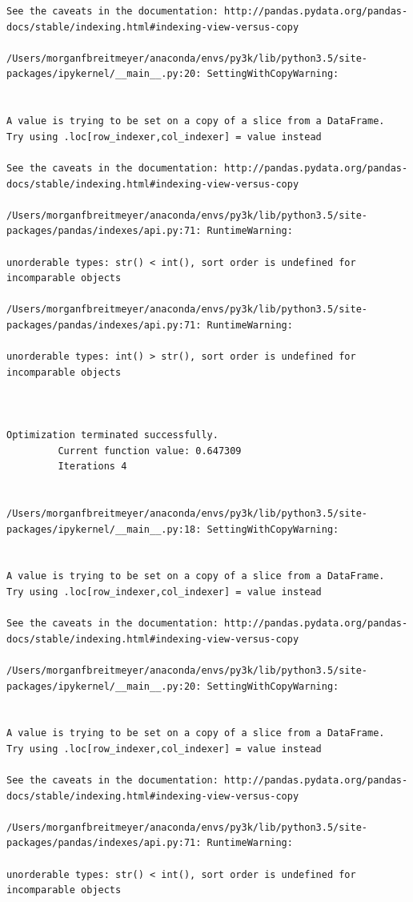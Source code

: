 \begin{lstlisting}
See the caveats in the documentation: http://pandas.pydata.org/pandas-docs/stable/indexing.html#indexing-view-versus-copy

/Users/morganfbreitmeyer/anaconda/envs/py3k/lib/python3.5/site-packages/ipykernel/__main__.py:20: SettingWithCopyWarning:


A value is trying to be set on a copy of a slice from a DataFrame.
Try using .loc[row_indexer,col_indexer] = value instead

See the caveats in the documentation: http://pandas.pydata.org/pandas-docs/stable/indexing.html#indexing-view-versus-copy

/Users/morganfbreitmeyer/anaconda/envs/py3k/lib/python3.5/site-packages/pandas/indexes/api.py:71: RuntimeWarning:

unorderable types: str() < int(), sort order is undefined for incomparable objects

/Users/morganfbreitmeyer/anaconda/envs/py3k/lib/python3.5/site-packages/pandas/indexes/api.py:71: RuntimeWarning:

unorderable types: int() > str(), sort order is undefined for incomparable objects



Optimization terminated successfully.
         Current function value: 0.647309
         Iterations 4


/Users/morganfbreitmeyer/anaconda/envs/py3k/lib/python3.5/site-packages/ipykernel/__main__.py:18: SettingWithCopyWarning:


A value is trying to be set on a copy of a slice from a DataFrame.
Try using .loc[row_indexer,col_indexer] = value instead

See the caveats in the documentation: http://pandas.pydata.org/pandas-docs/stable/indexing.html#indexing-view-versus-copy

/Users/morganfbreitmeyer/anaconda/envs/py3k/lib/python3.5/site-packages/ipykernel/__main__.py:20: SettingWithCopyWarning:


A value is trying to be set on a copy of a slice from a DataFrame.
Try using .loc[row_indexer,col_indexer] = value instead

See the caveats in the documentation: http://pandas.pydata.org/pandas-docs/stable/indexing.html#indexing-view-versus-copy

/Users/morganfbreitmeyer/anaconda/envs/py3k/lib/python3.5/site-packages/pandas/indexes/api.py:71: RuntimeWarning:

unorderable types: str() < int(), sort order is undefined for incomparable objects


\end{lstlisting}
